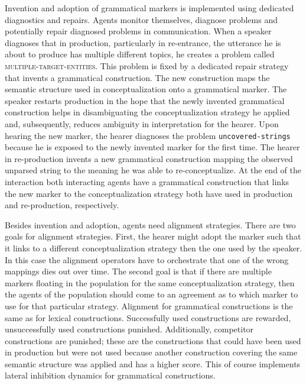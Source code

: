 Invention and adoption of grammatical markers is implemented 
using dedicated diagnostics and repairs. Agents monitor themselves, 
diagnose problems and potentially repair 
diagnosed problems in communication.
When a speaker diagnoses that in production, particularly in re-entrance, 
the utterance he is about to produce has multiple different topics, he 
creates a problem called \textsc{multiple-target-entities}. 
This problem is fixed by a dedicated repair strategy that invents 
a grammatical construction. The new construction maps the semantic 
structure used in conceptualization onto a grammatical marker.
The speaker restarts production in the hope that the newly invented 
grammatical construction helps in disambiguating the conceptualization 
strategy he applied and, subsequently, reduces ambiguity in interpretation 
for the hearer. 
Upon hearing the new marker, the hearer diagnoses the problem {\footnotesize\tt uncovered-strings} 
because he is exposed to the newly invented marker for the first time. The hearer 
in re-production invents a new grammatical construction mapping the 
observed unparsed string to the meaning he was able to re-conceptualize. 
At the end of the interaction both interacting agents have a grammatical 
construction that links the new marker to the conceptualization strategy both 
have used in production and re-production, respectively.

Besides invention and adoption, agents need alignment strategies. 
There are two goals for alignment strategies. First, the hearer might adopt 
the marker such that it links to a different conceptualization strategy then the 
one used by the speaker. In this case the alignment operators
have to orchestrate that one of the wrong mappings dies out over time. The 
second goal is that if there are multiple markers floating in the population 
for the same conceptualization strategy, then the agents of the population 
should come to an agreement as to which marker to use
for that particular strategy. Alignment for grammatical constructions is the same 
as for lexical constructions. Successfully used constructions are rewarded, unsuccessfully used constructions punished. Additionally, competitor 
constructions are punished; these are the constructions that could have 
been used in production but were not used because another construction 
covering the same semantic structure was applied and has a higher score. 
This of course implements lateral inhibition dynamics for grammatical constructions. 


